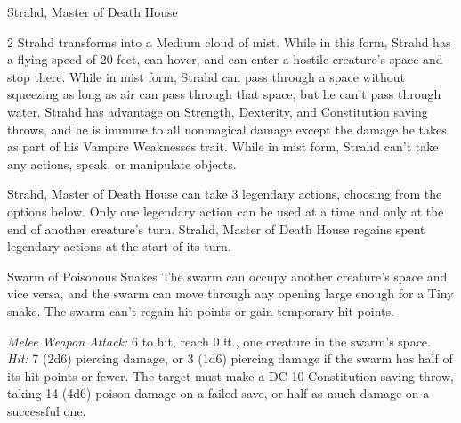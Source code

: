 \documentclass[10pt,a4paper,twoside,bg=print,twocolumn,openany,nodeprecatedcode]{dndbook}
\begin{document}
\begin{DndMonster}[float*=b,width=\textwidth + 8pt]{Strahd, Master of Death House}
\begin{multicols}{2}
Strahd transforms into a Medium cloud of mist. While in this form, Strahd has a flying speed of 20 feet, can hover, and can enter a hostile creature's space and stop there. While in mist form, Strahd can pass through a space without squeezing as long as air can pass through that space, but he can't pass through water. Strahd has advantage on Strength, Dexterity, and Constitution saving throws, and he is immune to all nonmagical damage except the damage he takes as part of his Vampire Weaknesses trait. While in mist form, Strahd can't take any actions, speak, or manipulate objects.

Strahd, Master of Death House can take 3 legendary actions, choosing from the options below. Only one legendary action can be used at a time and only at the end of another creature's turn. Strahd, Master of Death House regains spent legendary actions at the start of its turn.

\begin{DndMonsterLegendaryActions}
\end{DndMonsterLegendaryActions}
\end{multicols}
\end{DndMonster}



\begin{DndMonster}[float=t]{Swarm of Poisonous Snakes}
\DndMonsterBasics[
armor-class = {14},
hit-points = {\DndDice{8d8}},
speed = {30 ft., swim 30 ft.}
]
\DndMonsterAbilityScores[
 str = 8,
 dex = 18,
 con = 11,
 int = 1,
 wis = 10,
 cha = 3
]
\DndMonsterDetails[
damage-resistances = {bludgeoning, piercing, slashing},
condition-immunities = {charmed, frightened, grappled, paralyzed, petrified, prone, restrained, stunned},
senses = {blindsight 10 ft., passive perception 10},
challenge = 2,
]
The swarm can occupy another creature's space and vice versa, and the swarm can move through any opening large enough for a Tiny snake. The swarm can't regain hit points or gain temporary hit points.

\textsl{Melee Weapon Attack:} 6 to hit, reach 0 ft., one creature in the swarm's space. \textsl{Hit:} 7 (2d6) piercing damage, or 3 (1d6) piercing damage if the swarm has half of its hit points or fewer. The target must make a DC 10 Constitution saving throw, taking 14 (4d6) poison damage on a failed save, or half as much damage on a successful one.

\end{DndMonster}
\end{document}
